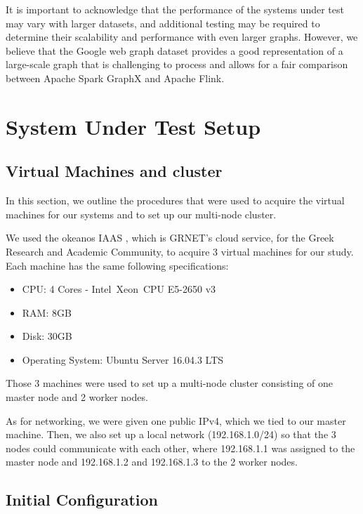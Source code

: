 \documentclass[conference]{IEEEtran}
\begin{document}
It is important to acknowledge that the performance of the systems under test may vary with larger datasets, and additional testing may be required to determine their scalability and performance with even larger graphs. However, we believe that the Google web graph dataset provides a good representation of a large-scale graph that is challenging to process and allows for a fair comparison between Apache Spark GraphX and Apache Flink.

\section{\textbf{System Under Test Setup}}\label{sut}

\subsection{Virtual Machines and cluster}

In this section, we outline the procedures that were used to acquire the virtual machines for our systems and to set up our multi-node cluster.

We used the okeanos IAAS \cite{b7}, which is GRNET's cloud service, for the Greek Research and Academic Community, to acquire 3 virtual machines for our study. Each machine has the same following specifications:

\begin{itemize}
\item CPU: 4 Cores - Intel\textregistered\ Xeon\textregistered\ CPU E5-2650 v3
\item RAM: 8GB
\item Disk: 30GB
\item Operating System: Ubuntu Server 16.04.3 LTS
\end{itemize}

Those 3 machines were used to set up a multi-node cluster consisting of one master node and 2 worker nodes.

As for networking, we were given one public IPv4, which we tied to our master machine. Then, we also set up a local network (192.168.1.0/24) so that the 3 nodes could communicate with each other, where 192.168.1.1 was assigned to the master node and 192.168.1.2 and 192.168.1.3 to the 2 worker nodes.

\subsection{Initial Configuration}
\end{document}
